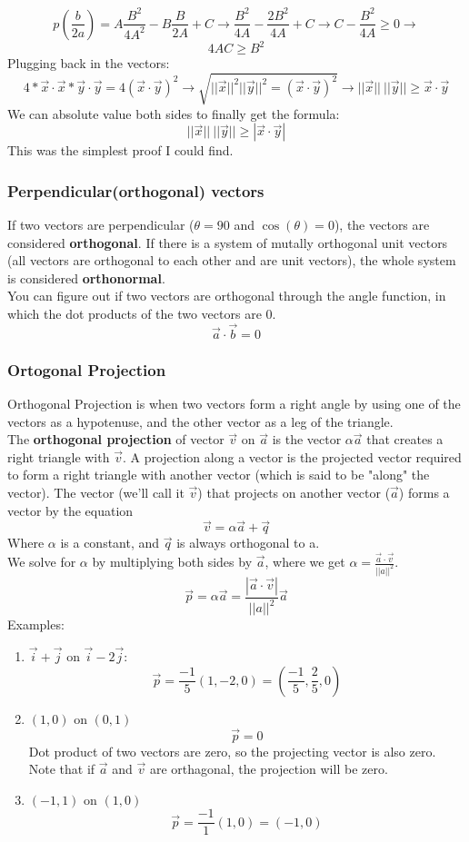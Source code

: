 \documentclass{article}
\begin{document}
$$ p(\frac{b}{2a}) = A\frac{B^2}{4A^2} - B\frac{B}{2A} + C \rightarrow \frac{B^2}{4A} - \frac{2B^2}{4A} + C\rightarrow 
C - \frac{B^2}{4A} \geq 0 \rightarrow$$
$$4AC \geq B^2$$
Plugging back in the vectors:
$$4*\vec{x}\cdot\vec{x} * \vec{y}\cdot\vec{y} = 4(\vec{x}\cdot\vec{y})^2 \rightarrow 
\sqrt{||\vec{x}||^2||\vec{y}||^2 = (\vec{x}\cdot\vec{y})^2} \rightarrow 
||\vec{x}||\ ||\vec{y}|| \geq \vec{x}\cdot\vec{y} $$
We can absolute value both sides to finally get the formula:
$$||\vec{x}||\ ||\vec{y}|| \geq |\vec{x}\cdot\vec{y}|$$
This was the simplest proof I could find.
\subsubsection{Perpendicular(orthogonal) vectors}
If two vectors are perpendicular ($\theta = 90$ and $\cos(\theta) = 0$), the vectors are considered \textbf{orthogonal}.
If there is a system of mutally orthogonal unit vectors (all vectors are orthogonal to each other and are unit vectors), the whole system is considered \textbf{orthonormal}.
\\ You can figure out if two vectors are orthogonal through the angle function, in which the dot products of the two vectors are 0.
$$\vec{a} \cdot \vec{b} = 0$$
\subsubsection{Ortogonal Projection}
Orthogonal Projection is when two vectors form a right angle by using one of the vectors as a hypotenuse, and the other
vector as a leg of the triangle. \\The \textbf{orthogonal projection} of vector $\vec{v}$ on $\vec{a}$ is the vector
$\alpha\vec{a}$ that creates a right triangle with $\vec{v}$.
A projection along a vector is the projected vector required to form a right triangle with another vector
(which is said to be "along" the vector).
The vector (we'll call it $\vec{v}$) that projects on another vector ($\vec{a}$) forms a vector by the equation
$$ \vec{v} = \alpha \vec{a} + \vec{q}$$
Where $\alpha$ is a constant, and $\vec{q}$ is always orthogonal to a.
\\ We solve for $\alpha$ by multiplying both sides by $\vec{a}$, where we get $\alpha = \frac{\vec{a}\cdot\vec{v}}{||a||^2}$.
$$\vec{p} = \alpha\vec{a} = \frac{|\vec{a}\cdot\vec{v}|}{||a||^2}\vec{a}$$
Examples:
\begin{enumerate}
  \item $\vec{i} + \vec{j}$ on $\vec{i} -2\vec{j}$:
	$$\vec{p} = \frac{-1}{5}(1,-2,0) = (\frac{-1}{5}, \frac{2}{5}, 0)$$
  \item $(1,0)$ on $(0,1)$
	$$\vec{p} = 0$$
	Dot product of two vectors are zero, so the projecting vector is also zero. Note that if 
	$\vec{a} $ and $\vec{v}$ are orthagonal, the projection will be zero.
  \item $(-1,1)$ on  $(1,0)$ 
	$$ \vec{p} = \frac{-1}{1}(1,0) = (-1,0)$$
\end{enumerate}
\end{document}
